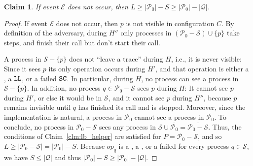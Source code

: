 \documentclass[11pt,letterpaper]{article}
\def\read{\text{\tt read}\xspace}
\newcommand{\SC}{\text{\tt SC}\xspace}
\newcommand{\LL}{\text{\tt LL}\xspace}
\newtheorem{claim}[theorem]{Claim}
\newcommand{\EE}{\mathcal{E}}
\newcommand{\PP}{\mathcal{P}}
\newcommand{\QQ}{\mathcal{Q}}
\renewcommand{\SS}{\mathcal{S}}
\newcommand{\op}{\ensuremath{\mathit{op}}}
\begin{document}
\begin{claim}\label{clm:lb_p_not_visible}
  If event $\EE$ does not occur, then $L\geq |\PP_0|-S\geq |\PP_0|-|\QQ|$.
\end{claim}
\begin{proof}
  If event $\EE$ does not occur, then $p$ is not visible in configuration $C$.
  By definition of the adversary, during $H''$ only processes in $(\PP_0-\SS)\cup\{p\}$ take steps, and finish their \FAI{} call but don't start their \FAD{} call.

  A process in $\SS-\{p\}$ does not ``leave a trace'' during $H$, i.e., it is never visible: Since it sees $p$ its only operation occurs during $H'$, and that operation is either a \read, a $\LL$, or a failed $\SC$.
  In particular, during $H$, no process can see a process in $\SS-\{p\}$.
  In addition, no process $q\in\PP_0-\SS$ sees $p$ during $H$:
  It cannot see $p$ during $H'$, or else it would be in $\SS$, and it cannot see $p$ during $H''$, because $p$ remains invisible until $q$ has finished its \FAI{} call and is stopped.
  Moreover, since the implementation is natural, a process in $\PP_0$ cannot see a process in $\overline{\PP_0}$.
  To conclude, no process in $\PP_0-\SS$ sees any process in $\SS\cup\overline{\PP_0}=\overline{\PP_0-\SS}$.
  Thus, the conditions of Claim~\ref{clm:lb_helper} are satisfied for $P=\PP_0-\SS$, and so $L\geq |\PP_0-\SS|=|\PP_0|-S$.
  Because $\op_q$ is a \read, a \LL, or a failed \SC for every process $q\in\SS$, we have $S\leq |\QQ|$ and thus $|\PP_0|-S\geq |\PP_0|-|\QQ|$.
\end{proof}
\end{document}
